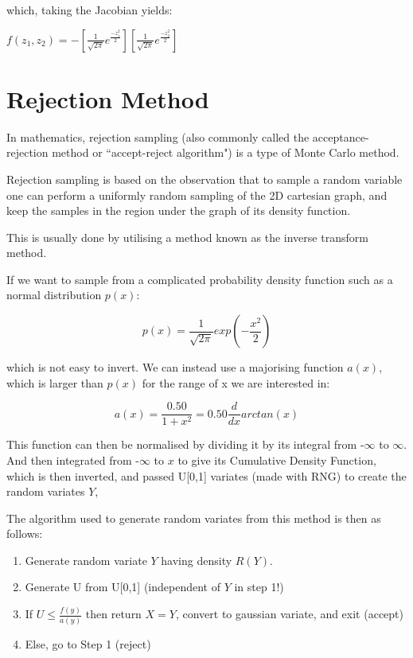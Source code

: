 \documentclass{article}
\begin{document}
which, taking the Jacobian yields:

$f(z_1, z_2) = -[\frac{1}{\sqrt{2\pi}}e^{\frac{-z_1^2}{2}}]  [\frac{1}{\sqrt{2\pi}}e^{\frac{-z_2^2}{2}}]$





\section{Rejection Method}

In mathematics, rejection sampling (also commonly called the acceptance-rejection method or ``accept-reject algorithm") is a type of Monte Carlo method\cite{Rejection}.

Rejection sampling is based on the observation that to sample a random variable one can perform a uniformly random sampling of the 2D cartesian graph, and keep the samples in the region under the graph of its density function. 

This is usually done by utilising a method known as the inverse transform method\cite{Inverse}.

If we want to sample from a complicated probability density function such as a normal distribution $p(x)$:

\begin{equation}
p(x) = \frac{1}{\sqrt{2\pi}} exp(-\frac{x^2}{2})
\end{equation}

which is not easy to invert. We can instead use a majorising function $a(x)$, which is larger than $p(x)$ for the range of x we are interested in:

\begin{equation}
a(x) = \frac{0.50}{1+x^2} = 0.50\frac{d}{dx}arctan(x)
\end{equation}

This function can then be normalised by dividing it by its integral from -$\infty$ to $\infty$. And then integrated from -$\infty$ to $x$ to give its Cumulative Density Function, which is then inverted, and passed U[0,1] variates (made with RNG) to create the random variates $Y$, 

The algorithm used to generate random variates from this method is then as follows:

\begin{enumerate}
\item Generate random variate $Y$ having density $R(Y)$.
\item Generate U from U[0,1] (independent of $Y$ in step 1!)
\item If $U \leq \frac{f(y)}{a(y)}$ then return $X = Y$, convert to gaussian variate, and exit (accept)
\item Else, go to Step 1 (reject)
\end{enumerate}
\end{document}
